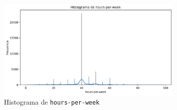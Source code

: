\documentclass[12pt,a4paper]{article}
\begin{document}
\begin{enumerate}
    \begin{figure}[H]
      \centering
      \begin{subfigure}[b]{0.45\textwidth}
        \includegraphics[width=\textwidth]{histogram_hours-per-week.png}
        \caption{Histograma de \texttt{hours-per-week}}
        \label{fig:hours_per_week_hist}
      \end{subfigure}
      \hfill
      \begin{subfigure}[b]{0.45\textwidth}

\end{subfigure}
\end{figure}
\end{enumerate}
\end{document}
